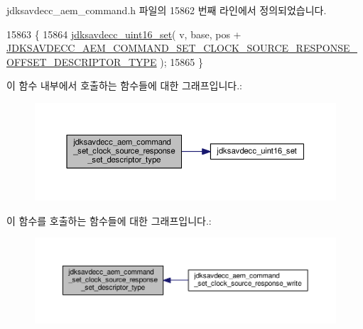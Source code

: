 jdksavdecc\+\_\+aem\+\_\+command.\+h 파일의 15862 번째 라인에서 정의되었습니다.


\begin{DoxyCode}
15863 \{
15864     \hyperlink{group__endian_ga14b9eeadc05f94334096c127c955a60b}{jdksavdecc\_uint16\_set}( v, base, pos + 
      \hyperlink{group__command__set__clock__source__response_gae9aedbbd181f8b1bf4ec0f1869719403}{JDKSAVDECC\_AEM\_COMMAND\_SET\_CLOCK\_SOURCE\_RESPONSE\_OFFSET\_DESCRIPTOR\_TYPE}
       );
15865 \}
\end{DoxyCode}


이 함수 내부에서 호출하는 함수들에 대한 그래프입니다.\+:
\nopagebreak
\begin{figure}[H]
\begin{center}
\leavevmode
\includegraphics[width=350pt]{group__command__set__clock__source__response_ga2f2a9ab7b29766d9e2a3db53816037f8_cgraph}
\end{center}
\end{figure}




이 함수를 호출하는 함수들에 대한 그래프입니다.\+:
\nopagebreak
\begin{figure}[H]
\begin{center}
\leavevmode
\includegraphics[width=350pt]{group__command__set__clock__source__response_ga2f2a9ab7b29766d9e2a3db53816037f8_icgraph}
\end{center}
\end{figure}


